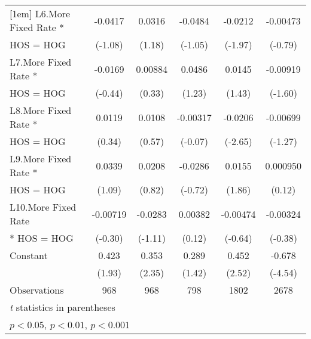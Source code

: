 {\begin{tabular}{l*{5}{c}}
[1em]
L6.More Fixed Rate *&     -0.0417         &      0.0316         &     -0.0484         &     -0.0212         &    -0.00473         \\
HOS = HOG           &     (-1.08)         &      (1.18)         &     (-1.05)         &     (-1.97)         &     (-0.79)         \\
[1em]
L7.More Fixed Rate *&     -0.0169         &     0.00884         &      0.0486         &      0.0145         &    -0.00919         \\
HOS = HOG           &     (-0.44)         &      (0.33)         &      (1.23)         &      (1.43)         &     (-1.60)         \\
[1em]
L8.More Fixed Rate *&      0.0119         &      0.0108         &    -0.00317         &     -0.0206\sym{**} &    -0.00699         \\
HOS = HOG           &      (0.34)         &      (0.57)         &     (-0.07)         &     (-2.65)         &     (-1.27)         \\
[1em]
L9.More Fixed Rate *&      0.0339         &      0.0208         &     -0.0286         &      0.0155         &    0.000950         \\
HOS = HOG           &      (1.09)         &      (0.82)         &     (-0.72)         &      (1.86)         &      (0.12)         \\
[1em]
L10.More Fixed Rate &    -0.00719         &     -0.0283         &     0.00382         &    -0.00474         &    -0.00324         \\
* HOS = HOG         &     (-0.30)         &     (-1.11)         &      (0.12)         &     (-0.64)         &     (-0.38)         \\
[1em]
Constant            &       0.423         &       0.353\sym{*}  &       0.289         &       0.452\sym{*}  &      -0.678\sym{***}\\
                    &      (1.93)         &      (2.35)         &      (1.42)         &      (2.52)         &     (-4.54)         \\
\hline
Observations        &         968         &         968         &         798         &        1802         &        2678         \\
\hline\hline
\multicolumn{6}{l}{\footnotesize \textit{t} statistics in parentheses}\\
\multicolumn{6}{l}{\footnotesize \sym{*} \(p<0.05\), \sym{**} \(p<0.01\), \sym{***} \(p<0.001\)}\\
\end{tabular}
}
